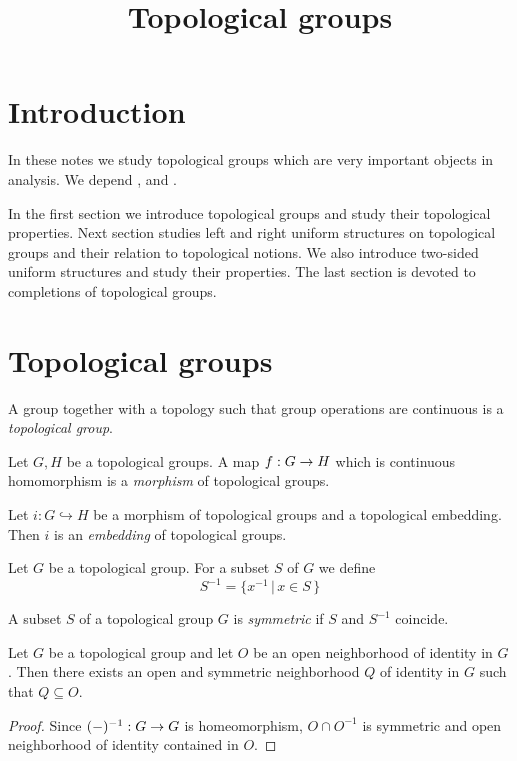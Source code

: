 \documentclass[10pt]{amsart}
\begin{document}
\title{Topological groups}
\date{}
\maketitle

\section{Introduction}
\noindent
In these notes we study topological groups which are very important objects in analysis. We depend \cite{Topological_Spaces}, \cite{Filters_in_topology} and \cite{Uniform_Spaces}.

In the first section we introduce topological groups and study their topological properties. Next section studies left and right uniform structures on topological groups and their relation to topological notions. We also introduce two-sided uniform structures and study their properties. The last section is devoted to completions of topological groups.

\section{Topological groups}

\begin{definition}
	A group together with a topology such that group operations are continuous is a \textit{topological group}.
\end{definition}

\begin{definition}
	Let $G,H$ be a topological groups. A map $f:G\rightarrow H$ which is continuous homomorphism is a \textit{morphism} of topological groups.
\end{definition}

\begin{definition}
	Let $i:G\hookrightarrow H$ be a morphism of topological groups and a topological embedding. Then $i$ is an \textit{embedding} of topological groups.
\end{definition}
\noindent
Let $G$ be a topological group. For a subset $S$ of $G$ we define
$$S^{-1} = \big\{x^{-1}\,\big|\,x\in S\,\big\}$$

\begin{definition}
	A subset $S$ of a topological group $G$ is \textit{symmetric} if $S$ and $S^{-1}$ coincide.
\end{definition}

\begin{fact}\label{fact:symmetric_neighborhoods_of_unit_generate_base}
	Let $G$ be a topological group and let $O$ be an open neighborhood of identity in $G$. Then there exists an open and symmetric neighborhood $Q$ of identity in $G$ such that $Q\subseteq O$.
\end{fact}
\begin{proof}
	Since $(-)^{-1}:G\rightarrow G$ is homeomorphism, $O \cap O^{-1}$ is symmetric and open neighborhood of identity contained in $O$.
\end{proof}
\end{document}
